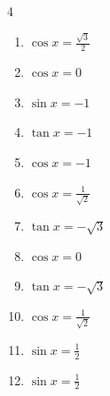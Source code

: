 \begin{multicols}{4}
\begin{enumerate}
  \item $\displaystyle \cos{x}  = \frac{\sqrt{3}}{2}$


  \item $\displaystyle \cos{x}  = 0$


  \item $\displaystyle \sin{x}  = -1$


  \item $\displaystyle \tan{x}  = -1$


\columnbreak %

  \item $\displaystyle \cos{x}  = -1$


  \item $\displaystyle \cos{x}  = \frac{1}{\sqrt{2}}$


  \item $\displaystyle \tan{x}  = -\sqrt{3}$


  \item $\displaystyle \cos{x}  = 0$


  \item $\displaystyle \tan{x}  = -\sqrt{3}$


  \item $\displaystyle \cos{x}  = \frac{1}{\sqrt{2}}$


  \item $\displaystyle \sin{x}  = \frac{1}{2}$


  \item $\displaystyle \sin{x}  = \frac{1}{2}$


\end{enumerate}
\end{multicols}

